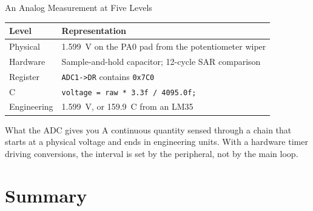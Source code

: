 \documentclass[9pt,aspectratio=169,xcolor=table]{beamer}
\begin{document}
\begin{frame}{An Analog Measurement at Five Levels}
    \begin{center}
    {\small
    \striped
    \begin{tabular}{@{}l R{.65\textwidth}@{}}
        \toprule
        \textbf{Level} & \textbf{Representation} \\
        \midrule
        Physical    & 1.599~V on the PA0 pad from the potentiometer wiper \\
        Hardware    & Sample-and-hold capacitor; 12-cycle SAR comparison \\
        Register    & \texttt{ADC1->DR} contains \texttt{0x7C0} \\
        C           & \texttt{voltage = raw * 3.3f / 4095.0f;} \\
        Engineering & 1.599~V, or 159.9~\textdegree{}C from an LM35 \\
        \bottomrule
    \end{tabular}}
    \end{center}

    \vspace{3mm}
    \begin{block}{What the ADC gives you}
        A continuous quantity sensed through a chain that starts at a
        physical voltage and ends in engineering units. With a hardware
        timer driving conversions, the interval is set by the peripheral,
        not by the main loop.
    \end{block}
\end{frame}


\section{Summary}
\end{document}
